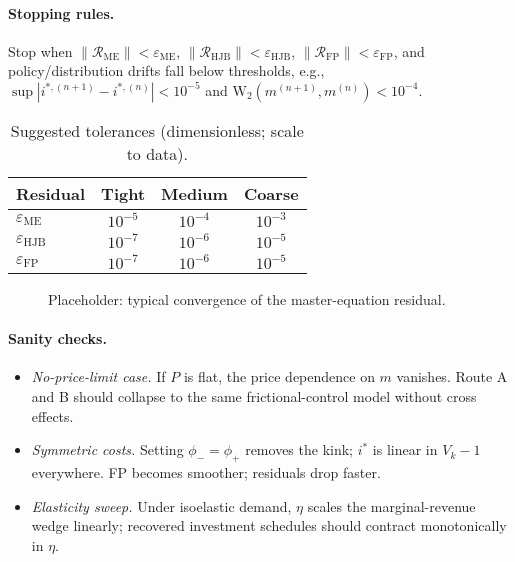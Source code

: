 ﻿\documentclass[11pt,letterpaper,oneside]{article}
\numberwithin{equation}{section}
\newcommand{\1}{\mathbf{1}}
\begin{document}
\paragraph{Stopping rules.}
Stop when $\|\mathcal{R}_{\mathrm{ME}}\|<\varepsilon_{\mathrm{ME}}$, $\|\mathcal{R}_{\mathrm{HJB}}\|<\varepsilon_{\mathrm{HJB}}$, $\|\mathcal{R}_{\mathrm{FP}}\|<\varepsilon_{\mathrm{FP}}$, and policy/distribution drifts fall below thresholds, e.g., $\sup|i^{*,(n+1)}-i^{*,(n)}|<10^{-5}$ and $\mathrm{W}_2(m^{(n+1)},m^{(n)})<10^{-4}$.

\begin{table}[ht]
\centering
\small
\begin{tabular}{@{}lccc@{}}
\toprule
Residual & Tight & Medium & Coarse \\
\midrule
$\varepsilon_{\mathrm{ME}}$ & $10^{-5}$ & $10^{-4}$ & $10^{-3}$ \\
$\varepsilon_{\mathrm{HJB}}$ & $10^{-7}$ & $10^{-6}$ & $10^{-5}$ \\
$\varepsilon_{\mathrm{FP}}$  & $10^{-7}$ & $10^{-6}$ & $10^{-5}$ \\
\bottomrule
\end{tabular}
\caption{Suggested tolerances (dimensionless; scale to data).}
\end{table}

\begin{figure}[ht]
\centering
{}
\caption{Placeholder: typical convergence of the master-equation residual.}
\end{figure}

\paragraph{Sanity checks.}
\begin{itemize}[leftmargin=1.25em]
\item \emph{No-price-limit case.} If $P$ is flat, the price dependence on $m$ vanishes. Route A and B should collapse to the same frictional-control model without cross effects.
\item \emph{Symmetric costs.} Setting $\phi_-=\phi_+$ removes the kink; $i^*$ is linear in $V_k-1$ everywhere. FP becomes smoother; residuals drop faster.
\item \emph{Elasticity sweep.} Under isoelastic demand, $\eta$ scales the marginal-revenue wedge linearly; recovered investment schedules should contract monotonically in $\eta$.
\end{itemize}
\end{document}
